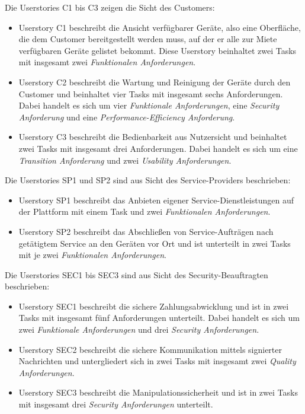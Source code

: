 Die Userstories C1 bis C3 zeigen die Sicht des Customers:
\begin{itemize}
  \item Userstory C1 beschreibt die Ansicht verfügbarer Geräte, also eine Oberfläche, die dem Customer bereitgestellt werden muss, auf der er alle zur Miete verfügbaren Geräte gelistet bekommt. Diese Userstory beinhaltet zwei Tasks mit insgesamt zwei \textit{Funktionalen Anforderungen}.
  \item Userstory C2 beschreibt die Wartung und Reinigung der Geräte durch den Customer und beinhaltet vier Tasks mit insgesamt sechs Anforderungen. Dabei handelt es sich um vier \textit{Funktionale Anforderungen}, eine \textit{Security Anforderung} und eine \textit{Performance-Efficiency Anforderung}.
  \item Userstory C3 beschreibt die Bedienbarkeit aus Nutzersicht und beinhaltet zwei Tasks mit insgesamt drei Anforderungen. Dabei handelt es sich um eine \textit{Transition Anforderung} und zwei \textit{Usability Anforderungen}.
\end{itemize}

Die Userstories SP1 und SP2 sind aus Sicht des Service-Providers beschrieben:
\begin{itemize}
  \item Userstory SP1 beschreibt das Anbieten eigener Service-Dienstleistungen auf der Plattform mit einem Task und zwei \textit{Funktionalen Anforderungen}.
  \item Userstory SP2 beschreibt das Abschließen von Service-Aufträgen nach getätigtem Service an den Geräten vor Ort und ist unterteilt in zwei Tasks mit je zwei \textit{Funktionalen Anforderungen}.
\end{itemize}

Die Userstories SEC1 bis SEC3 sind aus Sicht des Security-Beauftragten beschrieben:
\begin{itemize}
  \item Userstory SEC1 beschreibt die sichere Zahlungsabwicklung und ist in zwei Tasks mit insgesamt fünf Anforderungen unterteilt. Dabei handelt es sich um zwei \textit{Funktionale Anforderungen} und drei \textit{Security Anforderungen}.
  \item Userstory SEC2 beschreibt die sichere Kommunikation mittels signierter Nachrichten und untergliedert sich in zwei Tasks mit insgesamt zwei \textit{Quality Anforderungen}.
  \item Userstory SEC3 beschreibt die Manipulationssicherheit und ist in zwei Tasks mit insgesamt drei \textit{Security Anforderungen} unterteilt.
\end{itemize}



